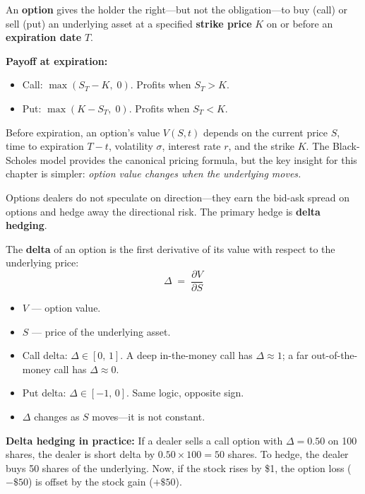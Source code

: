\begin{prereq}
An \textbf{option} gives the holder the right---but not the
obligation---to buy (call) or sell (put) an underlying asset at a
specified \textbf{strike price} $K$ on or before an
\textbf{expiration date} $T$.

\textbf{Payoff at expiration:}
\begin{itemize}[nosep]
  \item Call: $\max(S_T - K,\; 0)$.  Profits when $S_T > K$.
  \item Put:  $\max(K - S_T,\; 0)$.  Profits when $S_T < K$.
\end{itemize}
Before expiration, an option's value $V(S,t)$ depends on the current
price $S$, time to expiration $T-t$, volatility $\sigma$, interest
rate $r$, and the strike $K$.  The Black-Scholes model provides the
canonical pricing formula, but the key insight for this chapter is
simpler: \emph{option value changes when the underlying moves.}
\end{prereq}

Options dealers do not speculate on direction---they earn the bid-ask
spread on options and hedge away the directional risk.  The primary
hedge is \textbf{delta hedging}.

\begin{definition}[Delta]
The \textbf{delta} of an option is the first derivative of its value
with respect to the underlying price:
\begin{equation}
\label{eq:delta-def}
\Delta \;=\; \frac{\partial V}{\partial S}
\end{equation}
\begin{itemize}[nosep]
  \item $V$ --- option value.
  \item $S$ --- price of the underlying asset.
  \item Call delta: $\Delta \in [0,\,1]$.  A deep in-the-money call
        has $\Delta \approx 1$; a far out-of-the-money call has
        $\Delta \approx 0$.
  \item Put delta: $\Delta \in [-1,\,0]$.  Same logic, opposite sign.
  \item $\Delta$ changes as $S$ moves---it is not constant.
\end{itemize}
\end{definition}

\textbf{Delta hedging in practice:} If a dealer sells a call option
with $\Delta = 0.50$ on 100 shares, the dealer is short delta by
$0.50 \times 100 = 50$ shares.  To hedge, the dealer buys 50 shares
of the underlying.  Now, if the stock rises by \$1, the option loss
($-\$50$) is offset by the stock gain ($+\$50$).

